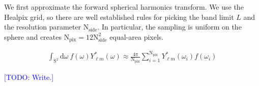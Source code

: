 \documentclass{aastex6}
\renewcommand{\d}{{\mathrm{d}}}
\newcommand{\eqn}[1]{\begin{eqnarray}#1\end{eqnarray}}
\newcommand{\nside}{{\mathrm{N}_\mathrm{side}}}
\newcommand{\npix}{{\mathrm{N}_\mathrm{pix}}}
\newcommand{\todo}[1]{\textcolor{blue}{[TODO: #1]}}
\begin{document}
We first approximate the forward spherical harmonics transform. We use the Healpix grid, so there are well established rules for picking the band limit $L$ and the resolution parameter $\nside$. In particular, the sampling is uniform on the sphere and creates $\npix = 12\mathrm{N}^2_\mathrm{side}$ equal-area pixels.

\eqn{
	\int_{\mathrm{S}^2} \d \omega \ f(\omega) Y_{\ell m}^*(\omega)  \approx  \frac{4\pi}{\npix}  \sum_{i=1}^\npix Y_{\ell m}^*(\omega_i)  f(\omega_i)
}

\todo{Write.}





\end{document}

